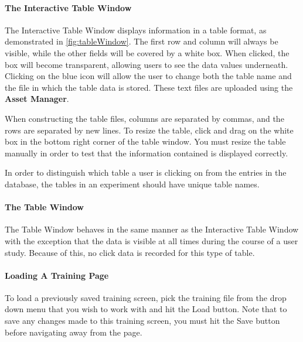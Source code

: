 \documentclass[article]{ij4uq}              %
\begin{document}
\FloatBarrier

\paragraph{The Interactive Table Window}

The Interactive Table Window displays information in a table format, as demonstrated in \ref{fig:tableWindow}.  The first row and column will always be visible, while the other fields will be covered by a white box.  When clicked, the box will become transparent, allowing users to see the data values underneath.  Clicking on the blue icon will allow the user to change both the table name and the file in which the table data is stored. These text files are uploaded using the \textbf{Asset Manager}.  

When constructing the table files, columns are separated by commas, and the rows are separated by new lines. To resize the table, click and drag on the white box in the bottom right corner of the table window. You must resize the table manually in order to test that the information contained is displayed correctly.

In order to distinguish which table a user is clicking on from the entries in the database, the tables in an experiment should have unique table names.

\paragraph{The Table Window}

The Table Window behaves in the same manner as the Interactive Table Window with the exception that the data is visible at all times during the course of a user study.  Because of this, no click data is recorded for this type of table.

\paragraph{Loading A Training Page}
To load a previously saved training screen, pick the training file from the drop down menu that you wish to work with and hit the Load button. Note that to save any changes made to this training screen, you must hit the Save button before navigating away from the page.
\end{document}
